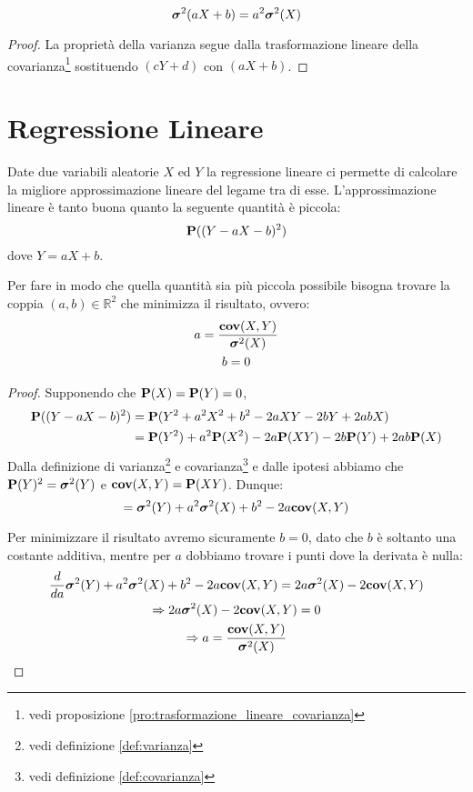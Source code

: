 \begin{proposition}
  \label{pro:trasformazione_lineare_varianza}
  \[ \boldsymbol\sigma^2(aX + b) = a^2 \boldsymbol\sigma^2(X) \]
\end{proposition}

\begin{proof}
  La proprietà della varianza segue dalla trasformazione lineare della covarianza\footnote{vedi proposizione \ref{pro:trasformazione_lineare_covarianza}} sostituendo \( (cY + d) \) con \( (aX + b) \).
\end{proof}  

\section{Regressione Lineare} %
\begin{definition}
  Date due variabili aleatorie $X$ ed $Y$ la regressione lineare ci permette di calcolare la migliore approssimazione lineare del legame tra di esse.
  L'approssimazione lineare è tanto buona quanto la seguente quantità è piccola:
  \[ \mathbf{P}((Y - aX - b)^2) \]
  dove \( Y = aX + b \). %

  Per fare in modo che quella quantità sia più piccola possibile bisogna trovare la coppia \( (a,b) \in \mathbb{R}^2 \) che minimizza il risultato, ovvero:
  \begin{gather*}
    a = \frac{\mathbf{cov}(X,Y)}{\boldsymbol\sigma^2(X)} \\
    b = 0
  \end{gather*}
\end{definition}

\begin{proof}
  Supponendo che \( \mathbf{P}(X) = \mathbf{P}(Y) = 0 \),
  \begin{align*}
    \mathbf{P}((Y - aX - b)^2) &= \mathbf{P}(Y^2 + a^2 X^2 + b^2 - 2aXY - 2bY + 2abX) \\
    &= \mathbf{P}(Y^2) + a^2\mathbf{P}(X^2) - 2a\mathbf{P}(XY) - 2b\mathbf{P}(Y) + 2ab\mathbf{P}(X)
  \end{align*}
  Dalla definizione di varianza\footnote{vedi definizione \ref{def:varianza}} e covarianza\footnote{vedi definizione \ref{def:covarianza}} e dalle ipotesi abbiamo che \( \mathbf{P}(Y)^2 = \boldsymbol\sigma^2(Y) \) e \( \mathbf{cov}(X,Y) = \mathbf{P}(XY) \).
  Dunque:
  \[ = \boldsymbol\sigma^2(Y) + a^2 \boldsymbol\sigma^2(X) + b^2 -2a \mathbf{cov}(X,Y) \] %

  Per minimizzare il risultato avremo sicuramente \( b = 0 \), dato che $b$ è soltanto una costante additiva, mentre per $a$ dobbiamo trovare i punti dove la derivata è nulla:
  \begin{gather*}
    \frac{d}{da} \boldsymbol\sigma^2(Y) + a^2 \boldsymbol\sigma^2(X) + b^2 -2a \mathbf{cov}(X,Y) = 2a\boldsymbol\sigma^2(X) - 2 \mathbf{cov}(X,Y) \\
    \Rightarrow 2a\boldsymbol\sigma^2(X) - 2 \mathbf{cov}(X,Y) = 0\\
    \Rightarrow a = \frac{\mathbf{cov}(X,Y)}{\boldsymbol\sigma^2(X)}
  \end{gather*}

\end{proof}


